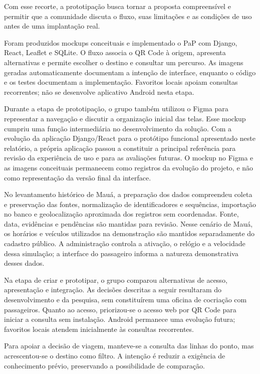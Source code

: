 Com esse recorte, a prototipação busca tornar a proposta compreensível e permitir que a comunidade discuta o fluxo, suas limitações e as condições de uso antes de uma implantação real.

Foram produzidos mockups conceituais e implementado o PaP com Django, React, Leaflet e SQLite. O fluxo associa o QR Code à origem, apresenta alternativas e permite escolher o destino e consultar um percurso. As imagens geradas automaticamente documentam a intenção de interface, enquanto o código e os testes documentam a implementação. Favoritos locais apoiam consultas recorrentes; não se desenvolve aplicativo Android nesta etapa.

Durante a etapa de prototipação, o grupo também utilizou o Figma para representar a navegação e discutir a organização inicial das telas. Esse mockup cumpriu uma função intermediária no desenvolvimento da solução. Com a evolução da aplicação Django/React para o protótipo funcional apresentado neste relatório, a própria aplicação passou a constituir a principal referência para revisão da experiência de uso e para as avaliações futuras. O mockup no Figma e as imagens conceituais permanecem como registros da evolução do projeto, e não como representação da versão final da interface.

No levantamento histórico de Mauá, a preparação dos dados compreendeu coleta e preservação das fontes, normalização de identificadores e sequências, importação no banco e geolocalização aproximada dos registros sem coordenadas. Fonte, data, evidências e pendências são mantidas para revisão. Nesse cenário de Mauá, os horários e veículos utilizados na demonstração são mantidos separadamente do cadastro público. A administração controla a ativação, o relógio e a velocidade dessa simulação; a interface do passageiro informa a natureza demonstrativa desses dados.

Na etapa de criar e prototipar, o grupo comparou alternativas de acesso, apresentação e integração. As decisões descritas a seguir resultaram do desenvolvimento e da pesquisa, sem constituírem uma oficina de cocriação com passageiros.
Quanto ao acesso, priorizou-se o acesso web por QR Code para iniciar a consulta sem instalação. Android permanece uma evolução futura; favoritos locais atendem inicialmente às consultas recorrentes.

Para apoiar a decisão de viagem, manteve-se a consulta das linhas do ponto, mas acrescentou-se o destino como filtro. A intenção é reduzir a exigência de conhecimento prévio, preservando a possibilidade de comparação.

